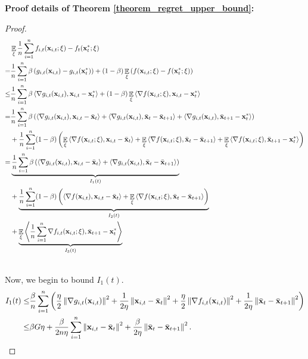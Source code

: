 \documentclass{article}
\begin{document}
\textbf{Proof details of Theorem \ref{theorem_regret_upper_bound}:}
\begin{proof}
\begin{align}
\nonumber
& \mathop{\mathbb{E}}_{\xi} \frac{1}{n}\sum_{i=1}^n f_{i,t}({\bf x}_{i,t};\xi) - f_t({\bf x}_t^\ast;\xi) \\ \nonumber
=& \frac{1}{n}\sum_{i=1}^n \beta \left( g_{i,t}({\bf x}_{i,t}) - g_{i,t}({\bf x}_t^\ast) \right) + (1-\beta) \mathop{\mathbb{E}}_{\xi} \left( f({\bf x}_{i,t};\xi) - f({\bf x}_t^\ast;\xi) \right) \\ \nonumber
\le & \frac{1}{n}\sum_{i=1}^n \beta \left\langle\nabla g_{i,t}({\bf x}_{i,t}), {\bf x}_{i,t} - {\bf x}_t^\ast  \right\rangle + (1-\beta) \mathop{\mathbb{E}}_{\xi} \left\langle\nabla f({\bf x}_{i,t};\xi), {\bf x}_{i,t} - {\bf x}_t^\ast  \right\rangle \\ \nonumber
 = & \frac{1}{n}\sum_{i=1}^n \beta \left( \left\langle\nabla g_{i,t}({\bf x}_{i,t}), {\bf x}_{i,t} - \bar{{\bf x}}_t  \right\rangle + \left\langle\nabla g_{i,t}({\bf x}_{i,t}), \bar{{\bf x}}_t - \bar{{\bf x}}_{t+1} \right\rangle + \left\langle\nabla g_{i,t}({\bf x}_{i,t}), \bar{{\bf x}}_{t+1} - {\bf x}_t^\ast   \right\rangle  \right) \\ \nonumber 
 & + \frac{1}{n}\sum_{i=1}^n (1-\beta) \left(  \mathop{\mathbb{E}}_{\xi} \left\langle\nabla f({\bf x}_{i,t};\xi), {\bf x}_{i,t} - \bar{{\bf x}}_t  \right\rangle +  \mathop{\mathbb{E}}_{\xi} \left\langle\nabla f({\bf x}_{i,t};\xi), \bar{{\bf x}}_t - \bar{{\bf x}}_{t+1}  \right\rangle + \mathop{\mathbb{E}}_{\xi} \left\langle\nabla f({\bf x}_{i,t};\xi), \bar{{\bf x}}_{t+1} - {\bf x}_t^\ast  \right\rangle  \right)\\ \nonumber
= & \underbrace{ \frac{1}{n}\sum_{i=1}^n \beta \left( \left\langle\nabla g_{i,t}({\bf x}_{i,t}), {\bf x}_{i,t} - \bar{{\bf x}}_t  \right\rangle + \left\langle\nabla g_{i,t}({\bf x}_{i,t}), \bar{{\bf x}}_t - \bar{{\bf x}}_{t+1}  \right\rangle  \right) }_{I_1(t)} \\ \nonumber 
 & + \underbrace{ \frac{1}{n}\sum_{i=1}^n (1-\beta) \left(  \left\langle\nabla f({\bf x}_{i,t}), {\bf x}_{i,t} - \bar{{\bf x}}_t  \right\rangle +  \mathop{\mathbb{E}}_{\xi} \left\langle\nabla f({\bf x}_{i,t};\xi), \bar{{\bf x}}_t - \bar{{\bf x}}_{t+1}  \right\rangle \right) }_{I_2(t)}\\ \nonumber 
&+ \underbrace{ \mathop{\mathbb{E}}_{\xi} \left\langle\frac{1}{n}\sum_{i=1}^n\nabla f_{i,t}({\bf x}_{i,t};\xi), \bar{{\bf x}}_{t+1} - {\bf x}_t^\ast  \right\rangle }_{I_3(t)}\\ \nonumber
\end{align}

Now, we begin to bound $I_1(t)$.
\begin{align}
\nonumber
I_1(t) \le & \frac{\beta}{n}\sum_{i=1}^n \left(  \frac{\eta}{2}\left\lVert\nabla g_{i,t}({\bf x}_{i,t})\right\rVert^2 + \frac{1}{2\eta}\left\lVert{\bf x}_{i,t} - \bar{{\bf x}}_t\right\rVert^2  + \frac{\eta}{2}\left\lVert\nabla f_{i,t}({\bf x}_{i,t})\right\rVert^2 + \frac{1}{2\eta}\left\lVert\bar{{\bf x}}_t - \bar{{\bf x}}_{t+1}\right\rVert^2  \right)\\ \nonumber
\le & \beta G \eta + \frac{\beta}{2n\eta }\sum_{i=1}^n \left\lVert{\bf x}_{i,t} - \bar{{\bf x}}_t\right\rVert^2 + \frac{\beta }{2\eta }\left\lVert\bar{{\bf x}}_t - \bar{{\bf x}}_{t+1}\right\rVert^2.
\end{align}


\end{proof}
\end{document}
